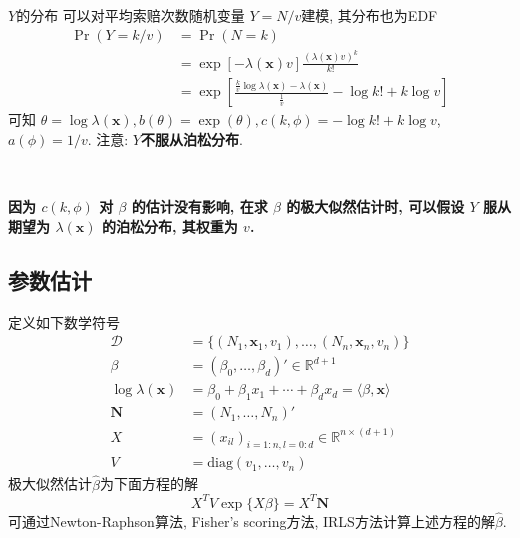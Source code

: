 \documentclass[professionalfont]{beamer}
\def\R{{\mathbb R}}  %
\def\bx{\boldsymbol{x}}
\begin{document}
\begin{frame}{$Y$的分布}
	可以对平均索赔次数随机变量 $Y=N/v$建模, 其分布也为EDF
	\begin{equation}
	\begin{aligned}
	\Pr(Y=k/v)&=\Pr(N=k)\\&=\exp\left[-\lambda(\bx)v\right]\frac{(\lambda(\bx)v)^k}{k!}\\&=\exp\left[\frac{\frac{k}{v}\log\lambda(\bx)-\lambda(\bx)}{\frac{1}{v}}-\log k!+k\log v\right]
	\end{aligned}
	\end{equation}
	可知 $\theta=\log\lambda(\bx), b(\theta)=\exp(\theta), c(k,\phi)=-\log k!+k\log v$, $a(\phi)=1/v.$ 	注意: \textbf{$Y$不服从泊松分布}.
	
	~
	
	\textbf{因为 $c(k,\phi)$ 对 $\beta$ 的估计没有影响, 在求 $\beta$ 的极大似然估计时, 可以假设 $Y$ 服从期望为 $\lambda(\bx)$ 的泊松分布, 其权重为 $v$.}
\end{frame}
\subsection{参数估计}
\begin{frame}
定义如下数学符号
\begin{equation*}
\begin{aligned}
\mathcal{D}&=\{(N_1,\bx_1,v_1),\ldots,(N_n,\bx_n,v_n)\}\\
\beta&=(\beta_0,\ldots,\beta_d)'\in\R^{d+1}\\
\log \lambda(\bx)&=\beta_0+\beta_1x_1+\cdots+\beta_dx_d=\langle\beta,\bx\rangle\\
\boldsymbol{N}&=(N_1,\ldots,N_n)'\\
X&=(x_{il})_{i=1:n,l=0:d}\in\R^{n\times(d+1)}\\
V&=\text{diag}(v_1,\ldots,v_n)
\end{aligned}
\end{equation*}
极大似然估计$\hat{\beta}$为下面方程的解
\begin{equation}X^TV\exp\{X\beta\}=X^T\boldsymbol{N}\end{equation}
可通过Newton-Raphson算法, Fisher's scoring方法, IRLS方法计算上述方程的解$\hat{\beta}$.
\end{frame}
\end{document}
